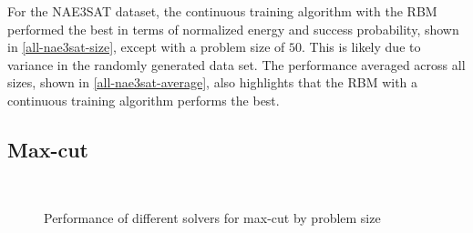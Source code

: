 For the NAE3SAT dataset, the continuous training algorithm with the RBM performed the best in terms of normalized energy and success probability, shown in \autoref{all-nae3sat-size}, except with a problem size of $50$. This is likely due to variance in the randomly generated data set. The performance averaged across all sizes, shown in \autoref{all-nae3sat-average}, also highlights that the RBM with a continuous training algorithm performs the best.

\subsection{Max-cut}

\begin{figure}[!htbp]
    \\
    \caption{Performance of different solvers for max-cut by problem size}
    \label{all-maxcut-size}
\end{figure}


